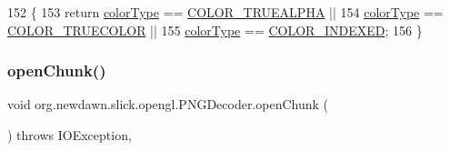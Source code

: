 \begin{DoxyCode}
152                            \{
153         \textcolor{keywordflow}{return} \mbox{\hyperlink{classorg_1_1newdawn_1_1slick_1_1opengl_1_1_p_n_g_decoder_a01a4bfaf3046e4b6eb944e7d48eb31c3}{colorType}} == \mbox{\hyperlink{classorg_1_1newdawn_1_1slick_1_1opengl_1_1_p_n_g_decoder_a96c509f7243118174cd8d25c50314713}{COLOR\_TRUEALPHA}} ||
154                 \mbox{\hyperlink{classorg_1_1newdawn_1_1slick_1_1opengl_1_1_p_n_g_decoder_a01a4bfaf3046e4b6eb944e7d48eb31c3}{colorType}} == \mbox{\hyperlink{classorg_1_1newdawn_1_1slick_1_1opengl_1_1_p_n_g_decoder_a54e437f6d3679769a356402f7c86b763}{COLOR\_TRUECOLOR}} ||
155                 \mbox{\hyperlink{classorg_1_1newdawn_1_1slick_1_1opengl_1_1_p_n_g_decoder_a01a4bfaf3046e4b6eb944e7d48eb31c3}{colorType}} == \mbox{\hyperlink{classorg_1_1newdawn_1_1slick_1_1opengl_1_1_p_n_g_decoder_a229a5a6a3ed73b28cbbe7d36bc78c4d1}{COLOR\_INDEXED}};
156     \}
\end{DoxyCode}
\mbox{\label{classorg_1_1newdawn_1_1slick_1_1opengl_1_1_p_n_g_decoder_afa7ad43df0de182a0fd27c9f6ca52e3d}} 
\subsubsection{\texorpdfstring{open\+Chunk()}{openChunk()}\hspace{0.1cm}{\footnotesize\ttfamily [1/2]}}
{\footnotesize\ttfamily void org.\+newdawn.\+slick.\+opengl.\+P\+N\+G\+Decoder.\+open\+Chunk (\begin{DoxyParamCaption}{ }\end{DoxyParamCaption}) throws I\+O\+Exception\hspace{0.3cm}{\ttfamily [inline]}, {\ttfamily [private]}}


